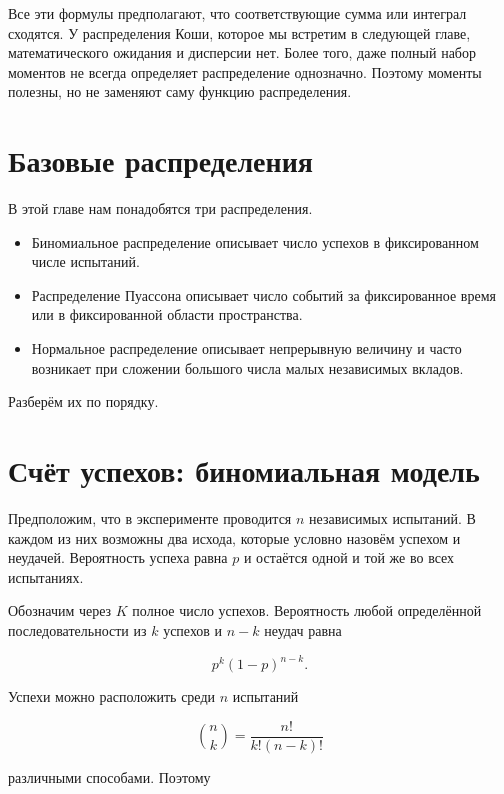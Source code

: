 \documentclass[
  russian,
  11pt,
  a4paper,
  open=any]{scrbook}
\providecommand{\tightlist}{%
  \setlength{\itemsep}{0pt}\setlength{\parskip}{0pt}}
\begin{document}
Все эти формулы предполагают, что соответствующие сумма или интеграл
сходятся. У распределения Коши, которое мы встретим в следующей главе,
математического ожидания и дисперсии нет. Более того, даже полный набор
моментов не всегда определяет распределение однозначно. Поэтому моменты
полезны, но не заменяют саму функцию распределения.

\section{Базовые
распределения}\label{ux431ux430ux437ux43eux432ux44bux435-ux440ux430ux441ux43fux440ux435ux434ux435ux43bux435ux43dux438ux44f}

В этой главе нам понадобятся три распределения.

\begin{itemize}
\tightlist
\item
  Биномиальное распределение описывает число успехов в фиксированном
  числе испытаний.
\item
  Распределение Пуассона описывает число событий за фиксированное время
  или в фиксированной области пространства.
\item
  Нормальное распределение описывает непрерывную величину и часто
  возникает при сложении большого числа малых независимых вкладов.
\end{itemize}

Разберём их по порядку.

\section{Счёт успехов: биномиальная
модель}\label{ux441ux447ux451ux442-ux443ux441ux43fux435ux445ux43eux432-ux431ux438ux43dux43eux43cux438ux430ux43bux44cux43dux430ux44f-ux43cux43eux434ux435ux43bux44c}

Предположим, что в эксперименте проводится \(n\) независимых испытаний.
В каждом из них возможны два исхода, которые условно назовём успехом и
неудачей. Вероятность успеха равна \(p\) и остаётся одной и той же во
всех испытаниях.

Обозначим через \(K\) полное число успехов. Вероятность любой
определённой последовательности из \(k\) успехов и \(n-k\) неудач равна

\[
p^k(1-p)^{n-k}.
\]

Успехи можно расположить среди \(n\) испытаний

\[
\binom{n}{k}=\frac{n!}{k!(n-k)!}
\]

различными способами. Поэтому
\end{document}
